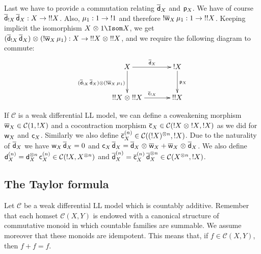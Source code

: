 \documentclass{LMCS}
\newcommand{\scC}{\mathcal{C}}
\begin{document}
Last we have to provide a commutation relating ${\overline{\mathsf d}}_{X}$ and $\mathsf p_{X}$. We
have of course ${\overline{\mathsf d}}_{{\mathord{!}}{X}}\,{\overline{\mathsf d}}_{X}:X\to{\mathord{!}}{{\mathord{!}}{X}}$. Also,
$\mu_1:1\to{\mathord{!}}{1}$ and therefore ${\mathord{!}}{{\overline{\mathsf{w}}}_{X}}\,\mu_1:1\to{\mathord{!}}{{\mathord{!}}{X}}$. Keeping implicit the
isomorphism $\Tens X\One\Isom X$, we get ${({\overline{\mathsf d}}_{{\mathord{!}}{X}}\,{\overline{\mathsf d}}_{X})}\mathrel\otimes{({\mathord{!}}{{\overline{\mathsf{w}}}_{X}}\,\mu_1)}:X\to{{\mathord{!}}{{\mathord{!}}{X}}}\mathrel\otimes{{\mathord{!}}{{\mathord{!}}{X}}}$, and we require the following diagram to commute:
\begin{equation*}\label{eq:coder-digg}
\vcenter{\hbox{\xymatrix @R=3em @C=3pc
{
  X\ar[r]^{\Coder X}\ar[d]_{\Tens{(\Coder{\Excl X}\Compl\Coder
    X)}{(\Excl{\Coweak X}\Compl\Monoidal_\One)}}
  & \Excl X\ar[d]^{\Digg X}\\
  \Tens{\Excl{\Excl X}}{\Excl{\Excl X}}\ar[r]^{\Cocontr{\Excl X}}
  & \Excl{\Excl X}
}}}
\end{equation*}








If $\scC$ is a weak differential LL model, we can define a coweakening morphism
$\Coweak X\in\scC(\One,\Excl X)$ and a cocontraction morphism $\Cocontr
X\in\scC(\Tens{\Excl X}{\Excl X},\Excl X)$ as we did for $\mathsf w_{X}$ and $\mathsf c_{X}$. Similarly we also define $\Cocontrm Xn\in\scC(\Supertens{(\Excl X)}n,\Excl
X)$. Due to the naturality of ${\overline{\mathsf d}}_{X}$ we have $\mathsf w_{X}\,{\overline{\mathsf d}}_{X}=0$ and
$\mathsf c_{X}\,{\overline{\mathsf d}}_{X}={{\overline{\mathsf d}}_{X}}\mathrel\otimes{{\overline{\mathsf{w}}}_{X}}+{{\overline{\mathsf{w}}}_{X}}\mathrel\otimes{{\overline{\mathsf d}}_{X}}$. We also define $\Derm Xn=\Supertens{\Der X}n\Complin\Contrm
Xn\in\scC(\Excl X,\Supertens Xn)$ and $\Coderm Xn=\Cocontrm
Xn\Complin\Supertens{\Coder X}n\in\scC(\Supertens Xn,\Excl X)$.

\subsection{The Taylor formula}
Let $\scC$ be a weak differential LL model which is countably additive. Remember
that each homset $\scC(X,Y)$ is endowed with a canonical structure of
commutative monoid in which countable families are summable. We assume moreover
that these monoids are idempotent. This means that, if $f\in\scC(X,Y)$, then
$f+f=f$. 
\end{document}
